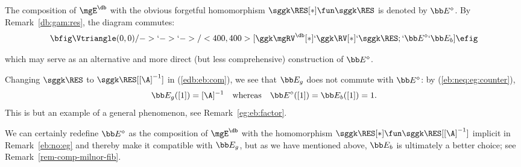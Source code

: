 The composition of $\mgE^{\db}$ with the obvious forgetful homomorphism $\sggk \RES[*] \fun \sggk \RES$ is denoted by $\bb E^{\diamond}$.  By Remark~\ref{db:gam:res}, the diagram commutes:
\begin{equation}\label{edb:eb:com}
\bfig
 \Vtriangle(0,0)/->`->`->/<400, 400>[{\ggk \mgRV^{\db}[*]}`{\ggk \RV[*]}`\sggk \RES; `\bb E^{\diamond}`\bb E_b]
\efig
\end{equation}

which may serve as an alternative and more direct (but less comprehensive) construction of $\bb E^{\diamond}$.

\begin{rem}\label{eb:not:eg}
Changing $\sggk \RES$ to $\sggk \RES[[\A]^{-1}]$ in (\ref{edb:eb:com}), we see that  $\bb E_g$ does not commute with $\bb E^{\diamond}$: by (\ref{eb:neq:eg:counter}),
\[
\bb E_g([1]) = [\A]^{-1} \quad \text{whereas} \quad \bb E^{\diamond}([1]) = \bb E_b([1]) = 1.
\]
This is but an example of a general phenomenon, see Remark~\ref{eg:eb:factor}.


We can certainly redefine $\bb E^{\diamond}$ as the composition of $\mgE^{\db}$ with  the homomorphism $\sggk \RES[*] \fun \sggk \RES[[\A]^{-1}]$ implicit in Remark~\ref{eb:no:eg} and thereby make it compatible with $\bb E_g$, but as we have mentioned above, $\bb E_b$ is ultimately a better choice; see Remark~\ref{rem-comp-milnor-fib}.
\end{rem}

